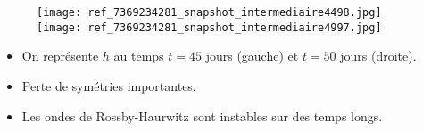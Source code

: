 \documentclass[11pt]{beamer}
\begin{document}
%





\begin{frame}{}
\begin{figure}
\texttt{[image: ref\_7369234281\_snapshot\_intermediaire4498.jpg]}
\texttt{[image: ref\_7369234281\_snapshot\_intermediaire4997.jpg]}
\end{figure}
\begin{itemize}
\item On représente $h$ au temps $t=45$ jours (gauche) et $t=50$ jours (droite).
\item Perte de symétries importantes.
\item Les ondes de Rossby-Haurwitz sont instables sur des temps longs.
\end{itemize}
\end{frame}






















\end{document}
